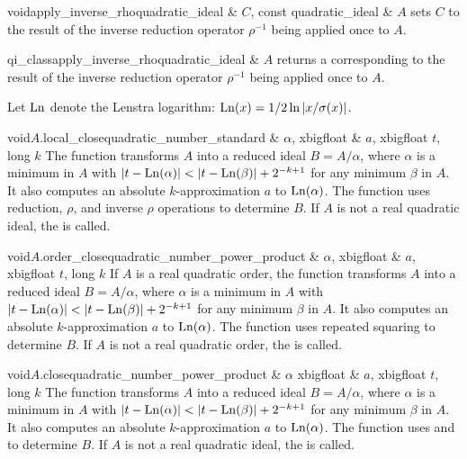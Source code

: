 \begin{fcode}{void}{apply_inverse_rho}{quadratic_ideal & $C$, const quadratic_ideal & $A$}
  sets $C$ to the result of the inverse reduction operator $\rho^{-1}$ being applied once to $A$.
\end{fcode}

\begin{fcode}{qi_class}{apply_inverse_rho}{quadratic_ideal & $A$}
  returns a  corresponding to the result of the inverse reduction operator
  $\rho^{-1}$ being applied once to $A$.
\end{fcode}





Let $\operatorname{Ln}$ denote the Lenstra logarithm: $\operatorname{Ln}(x) = 1/2 \ln|x / \sigma(x)|$.

\begin{fcode}{void}{$A$.local_close}{quadratic_number_standard & $\alpha$, xbigfloat & $a$,
    xbigfloat $t$, long $k$}%
  The function transforms $A$ into a reduced ideal $B = A / \alpha$, where $\alpha$ is a minimum
  in $A$ with $|t - \operatorname{Ln}(\alpha)| < |t - \operatorname{Ln}(\beta)| + 2^{-k+1}$ for any minimum $\beta$ in $A$.
  It also computes an absolute $k$-approximation $a$ to $\operatorname{Ln}(\alpha)$.  The function uses
  reduction, $\rho$, and inverse $\rho$ operations to determine $B$.  If $A$ is not a real
  quadratic ideal, the \LEH is called.
\end{fcode}

\begin{fcode}{void}{$A$.order_close}{quadratic_number_power_product & $\alpha$, xbigfloat & $a$,
    xbigfloat $t$, long $k$}%
  If $A$ is a real quadratic order, the function transforms $A$ into a reduced ideal $B = A /
  \alpha$, where $\alpha$ is a minimum in $A$ with $|t - \operatorname{Ln}(\alpha)| < |t - \operatorname{Ln}(\beta)| +
  2^{-k+1}$ for any minimum $\beta$ in $A$.  It also computes an absolute $k$-approximation $a$
  to $\operatorname{Ln}(\alpha)$.  The function uses repeated squaring to determine $B$.  If $A$ is not a real
  quadratic order, the \LEH is called.
\end{fcode}

\begin{fcode}{void}{$A$.close}{quadratic_number_power_product & $\alpha$ xbigfloat & $a$,
    xbigfloat $t$, long $k$}%
  The function transforms $A$ into a reduced ideal $B = A / \alpha$, where $\alpha$ is a minimum
  in $A$ with $|t - \operatorname{Ln}(\alpha)| < |t - \operatorname{Ln}(\beta)| + 2^{-k+1}$ for any minimum $\beta$ in $A$.
  It also computes an absolute $k$-approximation $a$ to $\operatorname{Ln}(\alpha)$.  The function uses
   and  to determine $B$.  If $A$ is not a real quadratic
  ideal, the \LEH is called.
\end{fcode}


